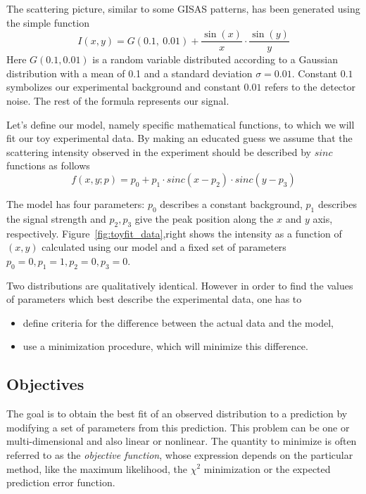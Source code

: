 The scattering picture, similar to some GISAS patterns, has been generated using the simple function
$$I(x,y) = G(0.1,~0.01) + \frac{\sin(x)}{x} \cdot \frac{\sin(y)}{y}$$
Here $G(0.1, 0.01)$ is a random variable distributed according to a Gaussian distribution
with a mean of 0.1 and a standard deviation $\sigma=0.01$.
Constant $0.1$ symbolizes our experimental background and constant $0.01$ refers
to the detector noise. The rest of the formula represents our signal.

Let's define our model, namely specific mathematical functions, to
which we will fit our toy experimental data. By making an educated
guess we assume that the scattering intensity observed
in the experiment should be described by $sinc$ functions as follows
\begin{equation} \label{eq:toy_model}
f(x,y;p) = p_0 + p_1 \cdot  sinc(x - p_2) \cdot sinc(y - p_3)
\end{equation}

The model has four parameters: $p_0$ describes a constant background,
$p_{1}$ describes the signal strength
and $p_2,p_3$ give the peak position along the $x$ and $y$ axis, respectively.
Figure~\ref{fig:toyfit_data},right shows the intensity as a function
of $(x,y)$ calculated using  our model and a fixed set of parameters 
$p_0=0, p_1=1, p_2=0, p_3=0$. 

Two distributions are qualitatively identical. However in order to find the
values of parameters which best describe the experimental data, one has to
\begin{itemize}
\item define criteria for the difference between the actual data and the model,
\item use a minimization procedure, which will minimize this difference.
\end{itemize}


\subsection{Objectives}

The goal is to obtain the best fit of an observed distribution
to a prediction by modifying a set of parameters from this
prediction. This problem can be one or multi-dimensional and also linear or
nonlinear. The quantity to minimize is often referred to as the
\textit{objective function}, whose expression depends on the
particular method, like the maximum likelihood, the $\chi^2$
minimization or the expected prediction error function. 

